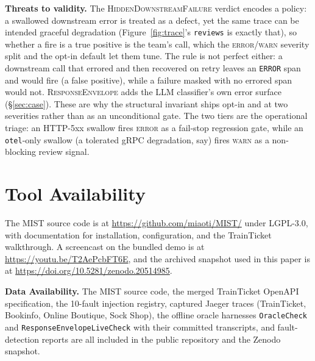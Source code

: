 \documentclass[sigconf,screen,review]{acmart}
\begin{document}
\textbf{Threats to validity.} The \textsc{HiddenDownstreamFailure} verdict encodes a policy: a swallowed downstream error is treated as a defect, yet the same trace can be intended graceful degradation (Figure~\ref{fig:trace}'s \texttt{reviews} is exactly that), so whether a fire is a true positive is the team's call, which the \textsc{error}/\textsc{warn} severity split and the opt-in default let them tune. The rule is not perfect either: a downstream call that errored and then recovered on retry leaves an \texttt{ERROR} span and would fire (a false positive), while a failure masked with no errored span would not. \textsc{ResponseEnvelope} adds the LLM classifier's own error surface (\S\ref{sec:case}). These are why the structural invariant ships opt-in and at two severities rather than as an unconditional gate. The two tiers are the operational triage: an HTTP-5xx swallow fires \textsc{error} as a fail-stop regression gate, while an \texttt{otel}-only swallow (a tolerated gRPC degradation, say) fires \textsc{warn} as a non-blocking review signal.

\section{Tool Availability}\label{sec:avail}

The MIST source code is at \url{https://github.com/miaoti/MIST/} under LGPL-3.0, with documentation for installation, configuration, and the TrainTicket walkthrough. A screencast on the bundled demo is at \url{https://youtu.be/T2AePcbFT6E}, and the archived snapshot used in this paper is at \url{https://doi.org/10.5281/zenodo.20514985}.

\textbf{Data Availability.} The MIST source code, the merged TrainTicket OpenAPI specification, the 10-fault injection registry, captured Jaeger traces (TrainTicket, Bookinfo, Online Boutique, Sock Shop), the offline oracle harnesses \texttt{OracleCheck} and \texttt{Response\allowbreak EnvelopeLiveCheck} with their committed transcripts, and fault-detection reports are all included in the public repository and the Zenodo snapshot.



\end{document}
